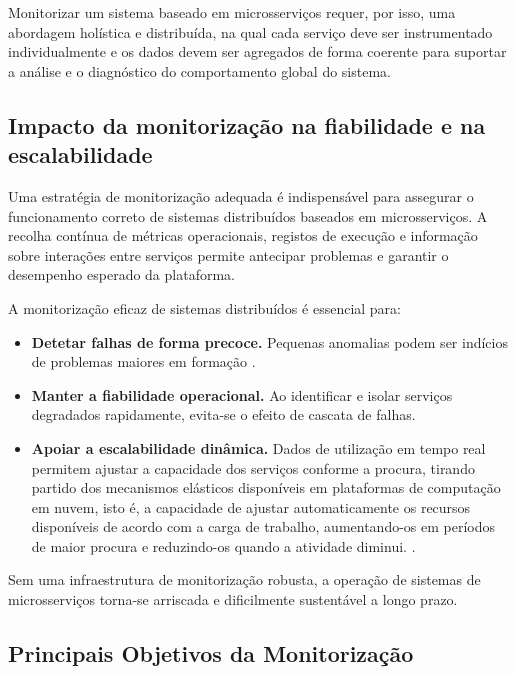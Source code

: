 Monitorizar um sistema baseado em microsserviços requer, por isso, uma abordagem holística e distribuída, na qual cada serviço deve ser instrumentado individualmente e os dados devem ser agregados de forma coerente para suportar a análise e o diagnóstico do comportamento global do sistema.


\subsection{Impacto da monitorização na fiabilidade e na escalabilidade}

Uma estratégia de monitorização adequada é indispensável para assegurar o funcionamento correto de sistemas distribuídos baseados em microsserviços. A recolha contínua de métricas operacionais, registos de execução e informação sobre interações entre serviços permite antecipar problemas e garantir o desempenho esperado da plataforma.

A monitorização eficaz de sistemas distribuídos é essencial para:

\begin{itemize}
    \item \textbf{Detetar falhas de forma precoce.} Pequenas anomalias podem ser indícios de problemas maiores em formação \cite{Burns2015}.
    
    \item \textbf{Manter a fiabilidade operacional.} Ao identificar e isolar serviços degradados rapidamente, evita-se o efeito de cascata de falhas.
    
    \item \textbf{Apoiar a escalabilidade dinâmica.} Dados de utilização em tempo real permitem ajustar a capacidade dos serviços conforme a procura, tirando partido dos mecanismos elásticos disponíveis em plataformas de computação em nuvem, isto é, a capacidade de ajustar automaticamente os recursos disponíveis de acordo com a carga de trabalho, aumentando-os em períodos de maior procura e reduzindo-os quando a atividade diminui. \cite{Dragoni2017}.
\end{itemize}

Sem uma infraestrutura de monitorização robusta, a operação de sistemas de microsserviços torna-se arriscada e dificilmente sustentável a longo prazo.


\subsection{Principais Objetivos da Monitorização}

